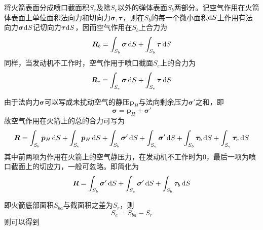 将火箭表面分成喷口截面积$S_e$及除$S_e$以外的弹体表面$S_b$两部分。记空气作用在火箭体表面上单位面积法向力和切向力$\bm{\sigma},\bm{\tau}$，则在$S_b$的每一个微小面积${\rm{d}} S$上作用有法向力$\bm{\sigma} {\rm{d}} S$记切向力$\bm{\tau} {\rm{d}} S$，因而空气作用在$S_b$上合力为
\begin{equation}
	\bm{R}_b = \int_{S_b} \bm{\sigma}\, {\rm{d}} S + \int_{S_b} \bm{\tau}\, {\rm{d}} S
\end{equation}
同样，当发动机不工作时，空气作用于喷口截面$S_e$上的合力为
\begin{equation}
	\bm{R}_e = \int_{S_e} \bm{\sigma}\, {\rm{d}} S + \int_{S_e}\bm{\tau}\, {\rm{d}} S
\end{equation}

由于法向力$\bm{\sigma}$可以写成未扰动空气的静压$\bm{p}_{H}$与法向剩余压力$\bm{\sigma}'$之和，即
\begin{equation}
	\bm{\sigma} = \bm{p}_H + \bm{\sigma}'
\end{equation}
故空气作用在火箭上的总的合力可写为
\begin{equation}
	\bm{R} = \int_{S_b}\bm{p}_H \, {\rm{d}} S + \int_{S_e}\bm{p}_H \, {\rm{d}} S + \int_{S_b}\bm{\sigma}'\, {\rm{d}} S + \int_{S_e} \bm{\sigma}' \, {\rm{d}} S + \int_{S_b} \bm{\tau}_b \, {\rm{d}} S + \int_{S_e} \bm{\tau}_e \, {\rm{d}} S
\end{equation}
其中前两项为作用在火箭上的空气静压力，在发动机不工作时为0，最后一项为喷口截面上的切应力，一般可忽略。即简化为
\begin{equation}
	\bm{R} = \int_{S_b}\bm{\sigma}'\, {\rm{d}} S + \int_{S_e} \bm{\sigma}' \, {\rm{d}} S + \int_{S_b} \bm{\tau}_b \, {\rm{d}} S 
\end{equation}

即火箭底部面积$S_{ba}$与截面积之差为$S_r$，则
\begin{equation}
	S_e = S_{ba} - S_r
\end{equation}
则可以得到

